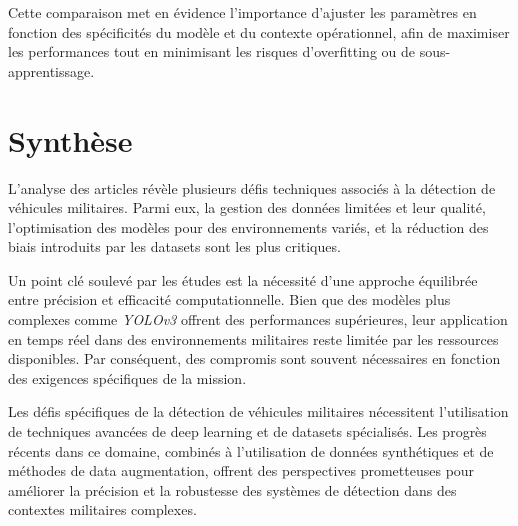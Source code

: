 Cette comparaison met en évidence l'importance d'ajuster les paramètres en fonction des spécificités du modèle et du contexte opérationnel, afin de maximiser les performances tout en minimisant les risques d'overfitting ou de sous-apprentissage.

\section{Synthèse}

L'analyse des articles révèle plusieurs défis techniques associés à la détection de véhicules militaires. Parmi eux, la gestion des données limitées et leur qualité, l'optimisation des modèles pour des environnements variés, et la réduction des biais introduits par les datasets sont les plus critiques.

Un point clé soulevé par les études est la nécessité d'une approche équilibrée entre précision et efficacité computationnelle. Bien que des modèles plus complexes comme \textit{YOLOv3} offrent des performances supérieures, leur application en temps réel dans des environnements militaires reste limitée par les ressources disponibles. Par conséquent, des compromis sont souvent nécessaires en fonction des exigences spécifiques de la mission.

Les défis spécifiques de la détection de véhicules militaires nécessitent l'utilisation de techniques avancées de deep learning et de datasets spécialisés. Les progrès récents dans ce domaine, combinés à l'utilisation de données synthétiques et de méthodes de data augmentation, offrent des perspectives prometteuses pour améliorer la précision et la robustesse des systèmes de détection dans des contextes militaires complexes.
